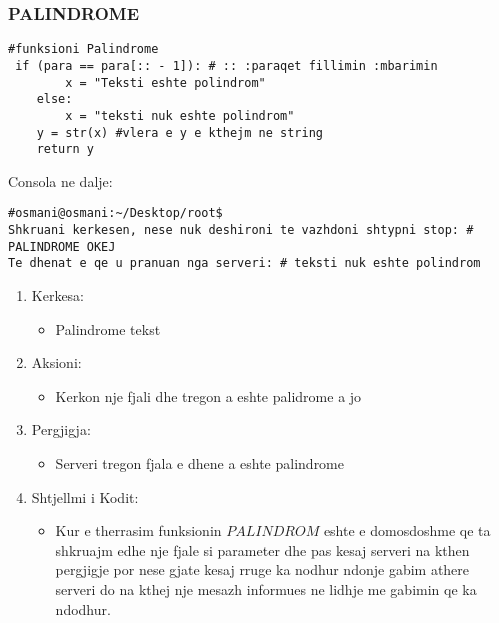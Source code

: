 \documentclass[]{article}
\begin{document}
\subsubsection{PALINDROME}
\begin{lstlisting}
#funksioni Palindrome
 if (para == para[:: - 1]): # :: :paraqet fillimin :mbarimin
        x = "Teksti eshte polindrom"
    else:
        x = "teksti nuk eshte polindrom"
    y = str(x) #vlera e y e kthejm ne string
    return y

\end{lstlisting}
\vspace{1cm}
\noindent Consola ne dalje:
\begin{lstlisting}
#osmani@osmani:~/Desktop/root$
Shkruani kerkesen, nese nuk deshironi te vazhdoni shtypni stop: # PALINDROME OKEJ
Te dhenat e qe u pranuan nga serveri: # teksti nuk eshte polindrom

\end{lstlisting}

\begin{enumerate}
\item Kerkesa:

\begin{itemize}
\item Palindrome tekst
\end{itemize}
\item Aksioni:
\begin{itemize}
\item Kerkon nje fjali dhe tregon a eshte palidrome a jo 
\end{itemize}
\item Pergjigja:
\begin{itemize}
\item Serveri tregon fjala e dhene a eshte palindrome 
\end{itemize}
\item Shtjellmi i Kodit:
\begin{itemize}
\item Kur e therrasim funksionin $PALINDROM$ eshte e domosdoshme qe ta shkruajm edhe nje fjale si parameter dhe pas kesaj serveri na kthen pergjigje por nese gjate kesaj rruge ka nodhur ndonje gabim athere serveri do na kthej nje mesazh informues ne lidhje me gabimin qe ka ndodhur.
\end{itemize}
\end{enumerate}
\newpage
\end{document}
